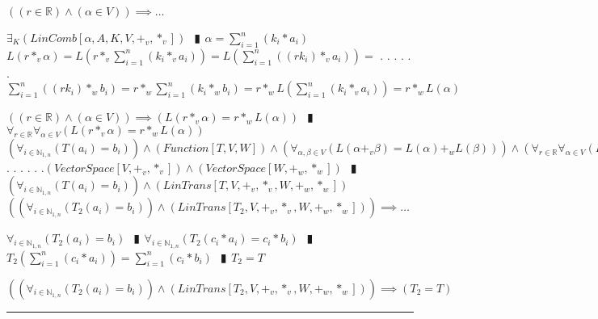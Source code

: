 \documentclass{book}
\newcommand{\cont}{\phantom{.}. . .\phantom{.}}
\newcommand{\pipe}{$\phantom{(}\vrectangleblack\phantom{)}$}
\newcommand{\pr}[1]{\left(#1\right)}
\begin{document}
\begin{enumerate}
  \lit $\pr{(r \in \mathbb{R}) \land (\alpha \in V)} \implies \ldots$
  \begin{enumerate}
    \lit $\exists_{K}(LinComb[\alpha, A, K, V, +_v, *_v])$ \pipe $\alpha = \sum_{i = 1}^{n}(k_i * a_i)$
    \lit $L(r *_v \alpha) = L\pr{r *_v \sum_{i = 1}^{n}(k_i *_v a_i)} = L\pr{\sum_{i = 1}^{n}\pr{(r k_i) *_v a_i}} = $ \cont
    \lit \cont $\sum_{i = 1}^{n}\pr{(r k_i) *_w b_i} = r *_w \sum_{i = 1}^{n}(k_i *_w b_i) = r *_w L\pr{\sum_{i = 1}^{n}(k_i *_v a_i)} = r *_w L(\alpha)$
  \end{enumerate}
  \lit $\pr{(r \in \mathbb{R}) \land (\alpha \in V)} \implies \pr{L(r *_v \alpha) = r *_w L(\alpha)}$ \pipe $\forall_{r \in \mathbb{R}} \forall_{\alpha \in V}\pr{L(r *_v \alpha) = r *_w L(\alpha)}$
  \lit $\pr{\forall_{i \in \mathbb{N}_{1, n}}\pr{T(a_i) = b_i}} \land (Function[T, V, W]) \land \pr{\forall_{\alpha, \beta \in V}\pr{L(\alpha +_v \beta) = L(\alpha) +_w L(\beta)}} \land \pr{\forall_{r \in \mathbb{R}} \forall_{\alpha \in V}\pr{L(r *_v \alpha) = r *_w L(\alpha)}} \land$ \cont
  \lit \cont $(VectorSpace[V, +_v, *_v]) \land (VectorSpace[W, +_w, *_w])$ \pipe $\pr{\forall_{i \in \mathbb{N}_{1, n}}\pr{T(a_i) = b_i}} \land (LinTrans[T, V, +_v, *_v, W, +_w, *_w])$
  \lit $\pr{\pr{\forall_{i \in \mathbb{N}_{1, n}}\pr{T_2(a_i) = b_i}} \land (LinTrans[T_2, V, +_v, *_v, W, +_w, *_w])} \implies \ldots$
  \begin{enumerate}
    \lit $\forall_{i \in \mathbb{N}_{1, n}}\pr{T_2(a_i) = b_i}$ \pipe $\forall_{i \in \mathbb{N}_{1, n}}\pr{T_2(c_i * a_i) = c_i * b_i}$ \pipe $T_2\pr{\sum_{i = 1}^{n}(c_i * a_i)} = \sum_{i = 1}^{n}(c_i * b_i)$ \pipe $T_2 = T$
  \end{enumerate}
  \lit $\pr{\pr{\forall_{i \in \mathbb{N}_{1, n}}\pr{T_2(a_i) = b_i}} \land (LinTrans[T_2, V, +_v, *_v, W, +_w, *_w])} \implies (T_2 = T)$
\end{enumerate} \vspace{.75mm} \hrule \vspace{.75mm} \ \\ 
\end{document}

